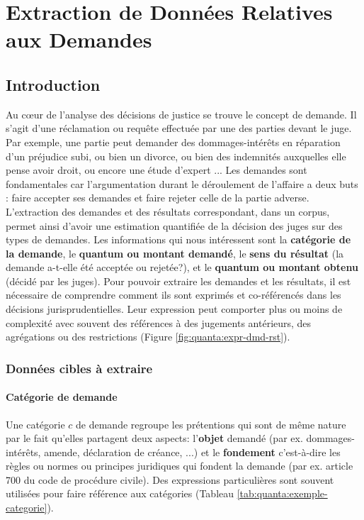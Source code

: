 \chapter{Extraction de Données Relatives aux Demandes}
\label{chap:quanta}

\section{Introduction}
\label{sec:quanta:introduction}
Au c\oe{}ur de l'analyse des décisions de justice se trouve le concept de demande. Il s'agit d'une réclamation ou requête effectuée par une des parties devant le juge. Par exemple, une partie peut demander des dommages-intérêts en réparation d'un préjudice subi, ou bien un divorce, ou bien des indemnités auxquelles elle pense avoir droit, ou encore une étude d'expert ... Les demandes sont fondamentales car l'argumentation durant le déroulement de l'affaire a deux buts : faire accepter ses demandes et faire rejeter celle de la partie adverse. L'extraction des demandes et des résultats correspondant, dans un corpus, permet ainsi d'avoir une estimation quantifiée de la décision des juges sur des types de demandes. Les informations qui nous intéressent sont la \textbf{catégorie de la demande}, le \textbf{quantum ou montant demandé}, le \textbf{sens du résultat} (la demande a-t-elle été acceptée ou rejetée?), et le \textbf{quantum ou montant obtenu} (décidé par les juges). Pour pouvoir extraire les demandes et les résultats, il est nécessaire de comprendre comment ils sont exprimés et co-référencés dans les décisions jurisprudentielles. Leur expression peut comporter plus ou moins de complexité avec souvent des références à des jugements antérieurs, des agrégations ou des restrictions (Figure \ref{fig:quanta:expr-dmd-rst}).

\subsection{Données cibles à extraire}
\subsubsection{Catégorie de demande}
Une catégorie $c$ de demande regroupe les prétentions qui sont de même nature par le fait qu'elles partagent deux aspects: l'\textbf{objet} demandé (par ex. dommages-intérêts, amende, déclaration de créance, ...) et le \textbf{fondement} c'est-à-dire les règles ou normes ou principes juridiques qui fondent la demande (par ex. article 700 du code de procédure civile). Des expressions particulières sont souvent utilisées pour faire référence aux catégories (Tableau \ref{tab:quanta:exemple-categorie}).


